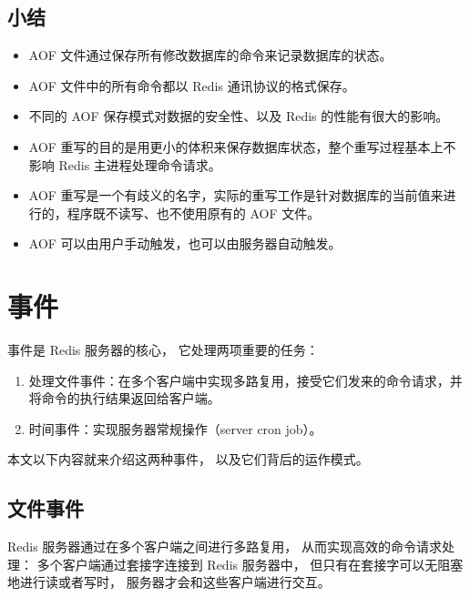 \documentclass[a4paper,11pt,english]{sphinxmanual}
\begin{document}
\subsection{小结}
\label{internal/aof:id15}\begin{itemize}
\item {} 
AOF 文件通过保存所有修改数据库的命令来记录数据库的状态。

\item {} 
AOF 文件中的所有命令都以 Redis 通讯协议的格式保存。

\item {} 
不同的 AOF 保存模式对数据的安全性、以及 Redis 的性能有很大的影响。

\item {} 
AOF 重写的目的是用更小的体积来保存数据库状态，整个重写过程基本上不影响 Redis 主进程处理命令请求。

\item {} 
AOF 重写是一个有歧义的名字，实际的重写工作是针对数据库的当前值来进行的，程序既不读写、也不使用原有的 AOF 文件。

\item {} 
AOF 可以由用户手动触发，也可以由服务器自动触发。

\end{itemize}


\section{事件}
\label{internal/ae::doc}\label{internal/ae:id1}
事件是 Redis 服务器的核心，
它处理两项重要的任务：
\begin{enumerate}
\item {} 
处理文件事件：在多个客户端中实现多路复用，接受它们发来的命令请求，并将命令的执行结果返回给客户端。

\item {} 
时间事件：实现服务器常规操作（server cron job）。

\end{enumerate}

本文以下内容就来介绍这两种事件，
以及它们背后的运作模式。


\subsection{文件事件}
\label{internal/ae:id2}
Redis 服务器通过在多个客户端之间进行多路复用，
从而实现高效的命令请求处理：
多个客户端通过套接字连接到 Redis 服务器中，
但只有在套接字可以无阻塞地进行读或者写时，
服务器才会和这些客户端进行交互。
\end{document}
